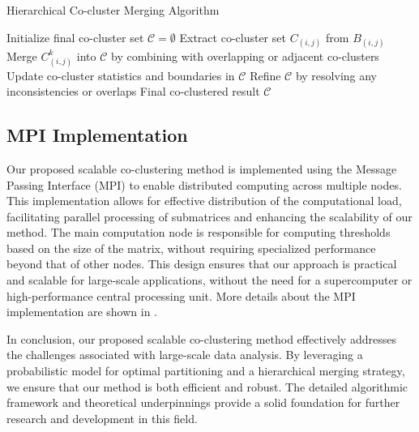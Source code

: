 \documentclass[journal]{IEEEtran}
\begin{document}
\begin{algorithm}[!t]
  \caption{Hierarchical Co-cluster Merging Algorithm}\label{alg:hierarchical_merging}
  \begin{algorithmic}[1]
    \STATE Initialize final co-cluster set $\mathcal{C} = \emptyset$
    \STATE Extract co-cluster set $C_{(i,j)}$ from $B_{(i,j)}$
    \STATE Merge $C_{(i,j)}^k$ into $\mathcal{C}$ by combining with overlapping or adjacent co-clusters
    \STATE Update co-cluster statistics and boundaries in $\mathcal{C}$
    \ENDFOR
    \ENDFOR
    \STATE Refine $\mathcal{C}$ by resolving any inconsistencies or overlaps
    \RETURN Final co-clustered result $\mathcal{C}$
  \end{algorithmic}
\end{algorithm}

\subsection{MPI Implementation}

Our proposed scalable co-clustering method is implemented using the Message Passing Interface (MPI) to enable distributed computing across multiple nodes. This implementation allows for effective distribution of the computational load, facilitating parallel processing of submatrices and enhancing the scalability of our method. The main computation node is responsible for computing thresholds based on the size of the matrix, without requiring specialized performance beyond that of other nodes. This design ensures that our approach is practical and scalable for large-scale applications, without the need for a supercomputer or high-performance central processing unit.
More details about the MPI implementation are shown in .

In conclusion, our proposed scalable co-clustering method effectively addresses the challenges associated with large-scale data analysis. By leveraging a probabilistic model for optimal partitioning and a hierarchical merging strategy, we ensure that our method is both efficient and robust. The detailed algorithmic framework and theoretical underpinnings provide a solid foundation for further research and development in this field.
\end{document}

